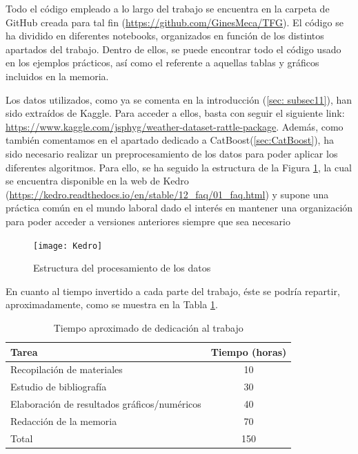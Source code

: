 \documentclass[12pt,twoside]{article}
\begin{document}
Todo el código empleado a lo largo del trabajo se encuentra en la carpeta de GitHub creada para tal fin (\url{https://github.com/GinesMeca/TFG}). El código se ha dividido en diferentes notebooks, organizados en función de los distintos apartados del trabajo. Dentro de ellos, se puede encontrar todo el código usado en los ejemplos prácticos, así como el referente a aquellas tablas y gráficos incluidos en la memoria.

Los datos utilizados, como ya se comenta en la introducción (\ref{sec: subsec11}), han sido extraídos de Kaggle. Para acceder a ellos, basta con seguir el siguiente link: \url{https://www.kaggle.com/jsphyg/weather-dataset-rattle-package}. Además, como también comentamos en el apartado dedicado a CatBoost(\ref{sec:CatBoost}), ha sido necesario realizar un preprocesamiento de los datos para poder aplicar los diferentes algoritmos. Para ello, se ha seguido la estructura de la Figura \ref{fig:Kedro}, la cual se encuentra disponible en la web de Kedro (\url{https://kedro.readthedocs.io/en/stable/12_faq/01_faq.html}) y supone una práctica común en el mundo laboral dado el interés en mantener una organización para poder acceder a versiones anteriores siempre que sea necesario
\begin{figure}[h]
\centering
\texttt{[image: Kedro]}
\caption{Estructura del procesamiento de los datos}
\label{fig:Kedro}
\end{figure}


En cuanto al tiempo invertido a cada parte del trabajo, éste se podría repartir, aproximadamente, como se muestra en la Tabla \ref{tab{02}}.
\begin{table}[ht] 
\centering
\begin{tabular}{lc} 
  \hline
 Tarea & Tiempo (horas) \\ 
  \hline
Recopilación de materiales &   10 \\ 
Estudio de bibliografía &   30\\ 
Elaboración de resultados gráficos/numéricos &  40 \\ 
Redacción de la memoria &  70 \\
 \hline
Total & 150\\
\hline
\end{tabular}
\caption{Tiempo aproximado de dedicación al trabajo} \label{tab{02}}
\end{table}
\end{document}
